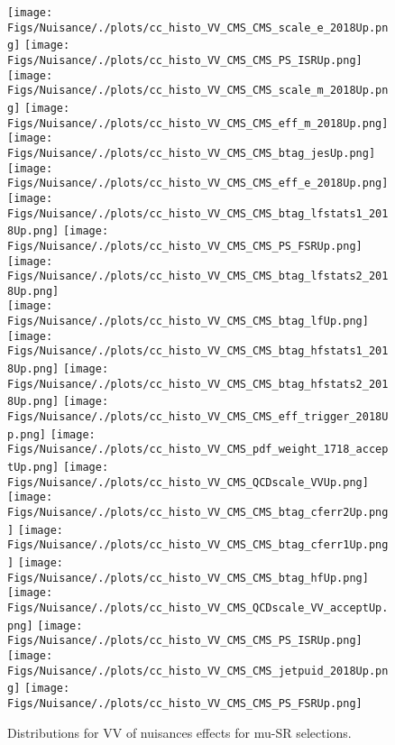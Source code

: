 \begin{figure*}[htbp]  
\centering 
\texttt{[image: Figs/Nuisance/./plots/cc\_histo\_VV\_CMS\_CMS\_scale\_e\_2018Up.png]}
\texttt{[image: Figs/Nuisance/./plots/cc\_histo\_VV\_CMS\_CMS\_PS\_ISRUp.png]}
\texttt{[image: Figs/Nuisance/./plots/cc\_histo\_VV\_CMS\_CMS\_scale\_m\_2018Up.png]}
\texttt{[image: Figs/Nuisance/./plots/cc\_histo\_VV\_CMS\_CMS\_eff\_m\_2018Up.png]}
\texttt{[image: Figs/Nuisance/./plots/cc\_histo\_VV\_CMS\_CMS\_btag\_jesUp.png]}
\texttt{[image: Figs/Nuisance/./plots/cc\_histo\_VV\_CMS\_CMS\_eff\_e\_2018Up.png]}
\texttt{[image: Figs/Nuisance/./plots/cc\_histo\_VV\_CMS\_CMS\_btag\_lfstats1\_2018Up.png]}
\texttt{[image: Figs/Nuisance/./plots/cc\_histo\_VV\_CMS\_CMS\_PS\_FSRUp.png]}
\texttt{[image: Figs/Nuisance/./plots/cc\_histo\_VV\_CMS\_CMS\_btag\_lfstats2\_2018Up.png]}\\
\texttt{[image: Figs/Nuisance/./plots/cc\_histo\_VV\_CMS\_CMS\_btag\_lfUp.png]}
\texttt{[image: Figs/Nuisance/./plots/cc\_histo\_VV\_CMS\_CMS\_btag\_hfstats1\_2018Up.png]}
\texttt{[image: Figs/Nuisance/./plots/cc\_histo\_VV\_CMS\_CMS\_btag\_hfstats2\_2018Up.png]}
\texttt{[image: Figs/Nuisance/./plots/cc\_histo\_VV\_CMS\_CMS\_eff\_trigger\_2018Up.png]}
\texttt{[image: Figs/Nuisance/./plots/cc\_histo\_VV\_CMS\_pdf\_weight\_1718\_acceptUp.png]}
\texttt{[image: Figs/Nuisance/./plots/cc\_histo\_VV\_CMS\_QCDscale\_VVUp.png]}
\texttt{[image: Figs/Nuisance/./plots/cc\_histo\_VV\_CMS\_CMS\_btag\_cferr2Up.png]}
\texttt{[image: Figs/Nuisance/./plots/cc\_histo\_VV\_CMS\_CMS\_btag\_cferr1Up.png]}
\texttt{[image: Figs/Nuisance/./plots/cc\_histo\_VV\_CMS\_CMS\_btag\_hfUp.png]}\\
\texttt{[image: Figs/Nuisance/./plots/cc\_histo\_VV\_CMS\_QCDscale\_VV\_acceptUp.png]}
\texttt{[image: Figs/Nuisance/./plots/cc\_histo\_VV\_CMS\_CMS\_PS\_ISRUp.png]}
\texttt{[image: Figs/Nuisance/./plots/cc\_histo\_VV\_CMS\_CMS\_jetpuid\_2018Up.png]}
\texttt{[image: Figs/Nuisance/./plots/cc\_histo\_VV\_CMS\_CMS\_PS\_FSRUp.png]}
\\ 
\caption{ 
   Distributions for VV of nuisances effects for mu-SR selections.
} 
\label{fig:VV_mu_SR} 
\end{figure*} 




